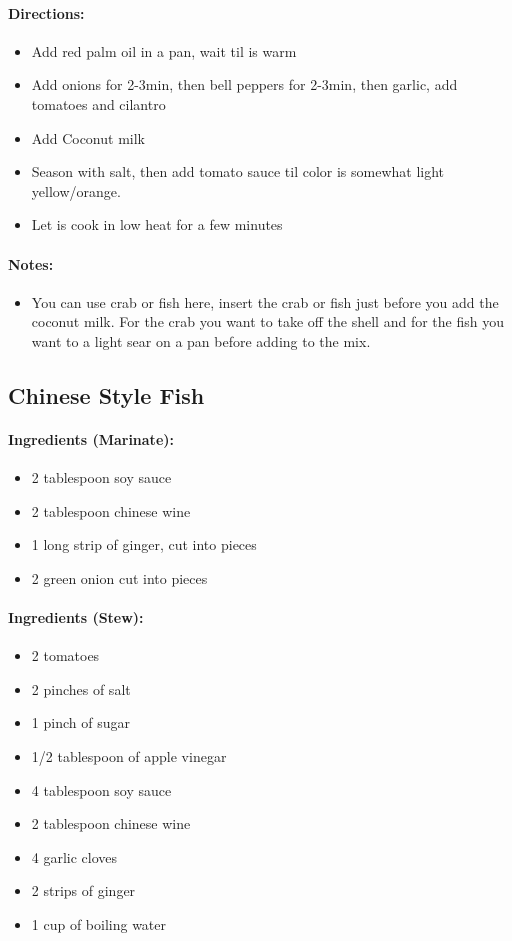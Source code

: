 \documentclass{article}
\begin{document}
\paragraph{Directions:}
\begin{itemize}
    \item Add red palm oil in a pan, wait til is warm
    \item Add onions for 2-3min, then bell peppers for 2-3min, then garlic, add tomatoes and cilantro
    \item Add Coconut milk
    \item Season with salt, then add tomato sauce til color is somewhat light yellow/orange.
    \item Let is cook in low heat for a few minutes
\end{itemize}

\paragraph{Notes:}
\begin{itemize}
    \item You can use crab or fish here, insert the crab or fish just before you add the coconut milk. For the crab you want to take off the shell and for the fish you want to a light sear on a pan before adding to the mix.
\end{itemize}

\subsection{Chinese Style Fish} 

\paragraph{Ingredients (Marinate):}
\begin{itemize}
    \item 2 tablespoon soy sauce
    \item 2 tablespoon chinese wine
    \item 1 long strip of ginger, cut into pieces
    \item 2 green onion cut into pieces
\end{itemize}  

\paragraph{Ingredients (Stew):}
\begin{itemize}
    \item 2 tomatoes
    \item 2 pinches of salt
    \item 1 pinch of sugar
    \item 1/2 tablespoon of apple vinegar
    \item 4 tablespoon soy sauce
    \item 2 tablespoon chinese wine
    \item 4 garlic cloves
    \item 2 strips of ginger
    \item 1 cup of boiling water
\end{itemize}  
\end{document}
